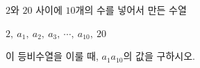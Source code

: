 $2$와 $20$ 사이에 $10$개의 수를 넣어서 만든 수열\par\smallskip\noindent\hspace*{1.5em}$2,\ a_1,\ a_2,\ a_3,\ \cdots,\ a_{10},\ 20$\par\smallskip\noindent 이 등비수열을 이룰 때, $a_1a_{10}$의 값을 구하시오.
